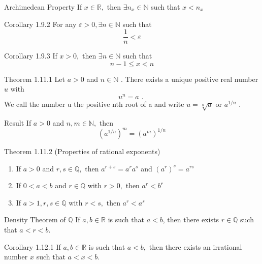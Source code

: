 \documentclass[10pt,landscape]{article}
\theoremstyle{definition}
\newcommand{\thistheoremname}{}
\newtheorem*{genericthm*}{\thistheoremname}
\newenvironment{namedthm*}[1]
{\renewcommand{\thistheoremname}{#1}\begin{genericthm*}}
{\end{genericthm*}}
\begin{document}
\begin{multicols}{3}
\begin{namedthm*}{Archimedean Property}
   If $x \in \mathbb{R},$ then $\exists n_{x} \in \mathbb{N}$ such that $x<n_{x}$
\end{namedthm*}

\begin{namedthm*}{Corollary 1.9.2}
  For any $\varepsilon>0, \exists n \in \mathbb{N}$ such that
$$
\frac{1}{n}<\varepsilon
$$
\end{namedthm*}

\begin{namedthm*}{Corollary 1.9.3}
 If $x>0,$ then $\exists n \in \mathbb{N}$ such that
$$
n-1 \leq x<n
$$
\end{namedthm*}
\begin{namedthm*}{Theorem 1.11.1}
   Let $a>0$ and $n \in \mathbb{N}$ . There exists a unique positive real number $u$ with
$$
u^{n}=a \text { . }
$$
We call the number u the positive nth root of a and write $u=\sqrt[n]{a}$ or $a^{1 / n}$ .
\end{namedthm*}

\begin{namedthm*}{Result}
  If $a>0$ and $n, m \in \mathbb{N},$ then
$$
\left(a^{1 / n}\right)^{m}=\left(a^{m}\right)^{1 / n}
$$
\end{namedthm*}

\begin{namedthm*}{Theorem 1.11.2 (Properties of rational exponents)}
   ~
    \begin{enumerate}
        \item If $a>0$ and $r, s \in \mathbb{Q},$ then $a^{r+s}=a^{r} a^{s}$ and $\left(a^{r}\right)^{s}=a^{r s}$
        \item If $0<a<b$ and $r \in \mathbb{Q}$ with $r>0,$ then $a^{r}<b^{r}$
        \item If $a>1, r, s \in \mathbb{Q}$ with $r<s,$ then $a^{r}<a^{s}$
    \end{enumerate}
\end{namedthm*}

\begin{namedthm*}{Density Theorem of $\mathbb{Q}$}
  If $a, b \in \mathbb{R}$ is such that $a<b$, then there exists $r \in \mathbb{Q}$ such that
$a<r<b .$
\end{namedthm*}

\begin{namedthm*}{Corollary 1.12.1}
   If $a, b \in \mathbb{R}$ is such that $a<b,$ then there exists an irrational number $x$
such that $a<x<b .$
\end{namedthm*}


\end{multicols}
\end{document}
